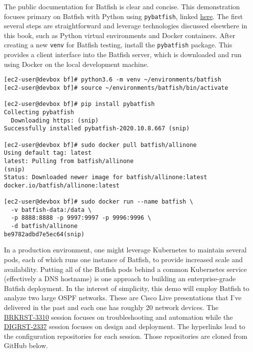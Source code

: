 The public documentation for Batfish is clear and concise. This demonstration
focuses primary on Batfish with Python using \verb|pybatfish|, linked
\href{https://pybatfish.readthedocs.io/en/latest/}{here}. The first several
steps are straightforward and leverage technologies discussed elsewhere in
this book, such as Python virtual environments and Docker containers. After
creating a new \verb|venv| for Batfish testing, install the \verb|pybatfish|
package. This provides a client interface into the Batfish server, which is
downloaded and run using Docker on the local development machine.

\begin{verbatim}
[ec2-user@devbox bf]# python3.6 -m venv ~/environments/batfish
[ec2-user@devbox bf]# source ~/environments/batfish/bin/activate

[ec2-user@devbox bf]# pip install pybatfish
Collecting pybatfish
  Downloading https: (snip)
Successfully installed pybatfish-2020.10.8.667 (snip)

[ec2-user@devbox bf]# sudo docker pull batfish/allinone
Using default tag: latest
latest: Pulling from batfish/allinone
(snip)
Status: Downloaded newer image for batfish/allinone:latest
docker.io/batfish/allinone:latest

[ec2-user@devbox bf]# sudo docker run --name batfish \
  -v batfish-data:/data \
  -p 8888:8888 -p 9997:9997 -p 9996:9996 \
  -d batfish/allinone
be9782adbd7e5ec64(snip)
\end{verbatim}

In a production environment, one might leverage Kubernetes to maintain
several pods, each of which runs one instance of Batfish, to provide
increased scale and availability. Putting all of the Batfish pods behind
a common Kubernetes service (effectively a DNS hostname) is one approach
to building an enterprise-grade Batfish deployment. In the interest
of simplicity, this demo will employ Batfish to analyze two large OSPF
networks. These are Cisco Live presentations that I've delivered in the
past and each one has roughly 20 network devices. The
\href{https://github.com/nickrusso42518/ospf_brkrst3310}{BRKRST-3310}
session focuses on troubleshooting and automation while the
\href{https://github.com/nickrusso42518/ospf_digrst2337}{DIGRST-2337}
session focuses on design and deployment. The hyperlinks lead to the
configuration repositories for each session. Those repositories are
cloned from GitHub below.


